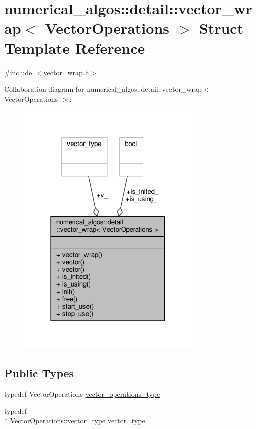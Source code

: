 \hypertarget{structnumerical__algos_1_1detail_1_1vector__wrap}{\section{numerical\-\_\-algos\-:\-:detail\-:\-:vector\-\_\-wrap$<$ Vector\-Operations $>$ Struct Template Reference}
\label{structnumerical__algos_1_1detail_1_1vector__wrap}
}


{\ttfamily \#include $<$vector\-\_\-wrap.\-h$>$}



Collaboration diagram for numerical\-\_\-algos\-:\-:detail\-:\-:vector\-\_\-wrap$<$ Vector\-Operations $>$\-:\nopagebreak
\begin{figure}[H]
\begin{center}
\leavevmode
\includegraphics[width=250pt]{structnumerical__algos_1_1detail_1_1vector__wrap__coll__graph}
\end{center}
\end{figure}
\subsection*{Public Types}
\begin{DoxyCompactItemize}
\item 
typedef Vector\-Operations \hyperlink{structnumerical__algos_1_1detail_1_1vector__wrap_aec858386dcc9cf18fdedd2ab4a606217}{vector\-\_\-operations\-\_\-type}
\item 
typedef \\*
Vector\-Operations\-::vector\-\_\-type \hyperlink{structnumerical__algos_1_1detail_1_1vector__wrap_ad1b05447249f58553a35e12c23cb3e12}{vector\-\_\-type}
\end{DoxyCompactItemize}

